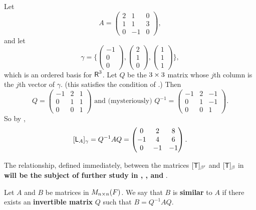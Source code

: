 \begin{example} \label{example 2.5.4}
Let
\[
    A = \begin{pmatrix}
        2 & 1 & 0 \\ 1 & 1 & 3 \\ 0 & -1 & 0
    \end{pmatrix},
\]
and let
\[
    \gamma = \bigg\{
        \begin{pmatrix} -1 \\ 0 \\ 0 \end{pmatrix}, 
        \begin{pmatrix} 2 \\ 1 \\ 0 \end{pmatrix}, 
        \begin{pmatrix} 1 \\ 1 \\ 1 \end{pmatrix}
    \bigg\},
\]
which is an ordered basis for \(\textsf{R}^3\).
Let \(Q\) be the \(3 \times 3\) matrix whose \(j\)th column is the \(j\)th vector of \(\gamma\). (this satisfies the condition of .)
Then
\[
    Q = \begin{pmatrix} -1 & 2 & 1 \\ 0 & 1 & 1 \\ 0 & 0 & 1 \end{pmatrix}
    \text{ and (mysteriously) }
    Q^{-1} = \begin{pmatrix} -1 & 2 & -1 \\ 0 & 1 & -1 \\ 0 & 0 & 1 \end{pmatrix}.
\]
So by ,
\[
    [\textsf{L}_A]_{\gamma} = Q^{-1} A Q = \begin{pmatrix} 0 & 2 & 8 \\ -1 & 4 & 6 \\ 0 & -1 & -1 \end{pmatrix}.
\]
\end{example}

\begin{remark} \label{remark 2.5.2}
The relationship, defined immediately, between the matrices \([\textsf{T}]_{\beta'}\) and \([\textsf{T}]_{\beta}\) in  \textbf{will be the subject of further study in , , and }.
\end{remark}

\begin{definition} \label{def 2.16}
Let \(A\) and \(B\) be matrices in \(M_{n \times n}(F)\).
We say that \(B\) is \textbf{similar}\textbf{} to \(A\) if there exists an \textbf{invertible matrix} \(Q\) such that \(B = Q^{-1} A Q\).
\end{definition}

